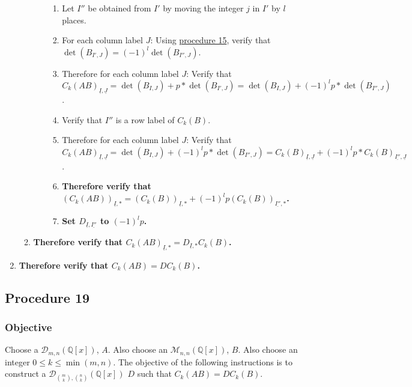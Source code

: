 \documentclass[twocolumn]{article}
\newcommand{\ul}[1]{\underline{#1}}
\begin{document}
\begin{enumerate}
\begin{enumerate}
\begin{enumerate}
\begin{enumerate}
								\item Let $I''$ be obtained from $I'$ by moving the integer $j$ in $I'$ by $l$ places.
								\item For each column label $J$: Using \hyperref[sec:procedure 15]{procedure 15}, verify that $\det(B_{I',J})=(-1)^l\det(B_{I'',J})$.
								\item Therefore for each column label $J$: Verify that ${C_k(AB)}_{\ul{I},\ul{J}}=\det(B_{I,J})+p*\det(B_{I',J})=\det(B_{I,J})+(-1)^lp*\det(B_{I'',J})$.
								\item Verify that $I''$ is a row label of $C_k(B)$.
								\item Therefore for each column label $J$: Verify that ${C_k(AB)}_{\ul{I},\ul{J}}=\det(B_{I,J})+(-1)^lp*\det(B_{I'',J})={C_k(B)}_{\ul{I},\ul{J}}+(-1)^lp*{C_k(B)}_{\ul{I''},\ul{J}}$.
								\item \textbf{Therefore verify that $(C_k(AB))_{\ul{I},*}=(C_k(B))_{\ul{I},*}+(-1)^lp(C_k(B))_{\ul{I''},*}$.}
								\item \textbf{Set $D_{\ul{I},\ul{I''}}$ to $(-1)^lp$.}
							\end{enumerate}
						\end{enumerate}
						\item \textbf{Therefore verify that ${C_k(AB)}_{\ul{I},*}=D_{\ul{I},*}C_k(B)$.}
					\end{enumerate}
					\item \textbf{Therefore verify that $C_k(AB)=DC_k(B)$.}
				\end{enumerate}
		\subsection{Procedure 19}\label{sec:procedure 19}
			\subsubsection{Objective}
				Choose a $\mathcal{D}_{m,n}(\mathbb{Q}[x])$, $A$. Also choose an $\mathcal{M}_{n,n}(\mathbb{Q}[x])$, $B$. Also choose an integer $0\le k\le\min(m,n)$. The objective of the following instructions is to construct a $\mathcal{D}_{\binom{m}{k},\binom{n}{k}}(\mathbb{Q}[x])$ $D$ such that $C_k(AB)=DC_k(B)$.
\end{document}
